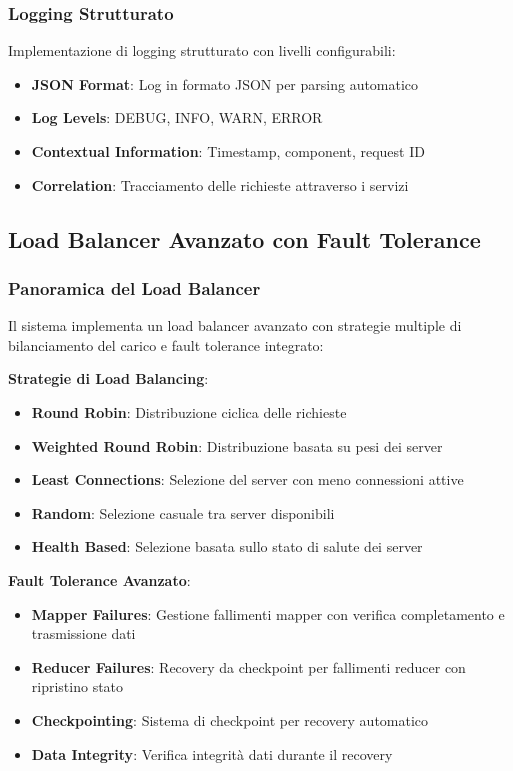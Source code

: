 \documentclass[12pt,a4paper]{article}
\begin{document}
\subsubsection{Logging Strutturato}

Implementazione di logging strutturato con livelli configurabili:

\begin{itemize}
\item \textbf{JSON Format}: Log in formato JSON per parsing automatico
\item \textbf{Log Levels}: DEBUG, INFO, WARN, ERROR
\item \textbf{Contextual Information}: Timestamp, component, request ID
\item \textbf{Correlation}: Tracciamento delle richieste attraverso i servizi
\end{itemize}

\subsection{Load Balancer Avanzato con Fault Tolerance}

\subsubsection{Panoramica del Load Balancer}

Il sistema implementa un load balancer avanzato con strategie multiple di bilanciamento del carico e fault tolerance integrato:

\textbf{Strategie di Load Balancing}:
\begin{itemize}
\item \textbf{Round Robin}: Distribuzione ciclica delle richieste
\item \textbf{Weighted Round Robin}: Distribuzione basata su pesi dei server
\item \textbf{Least Connections}: Selezione del server con meno connessioni attive
\item \textbf{Random}: Selezione casuale tra server disponibili
\item \textbf{Health Based}: Selezione basata sullo stato di salute dei server
\end{itemize}

\textbf{Fault Tolerance Avanzato}:
\begin{itemize}
\item \textbf{Mapper Failures}: Gestione fallimenti mapper con verifica completamento e trasmissione dati
\item \textbf{Reducer Failures}: Recovery da checkpoint per fallimenti reducer con ripristino stato
\item \textbf{Checkpointing}: Sistema di checkpoint per recovery automatico
\item \textbf{Data Integrity}: Verifica integrità dati durante il recovery
\end{itemize}
\end{document}
